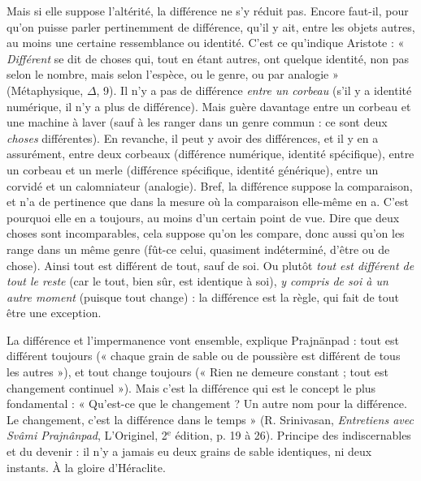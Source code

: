 Mais si elle suppose l’altérité, la différence ne s’y réduit pas. Encore faut-il,
pour qu’on puisse parler pertinemment de différence, qu’il y ait, entre les
objets autres, au moins une certaine ressemblance ou identité. C’est ce
qu’indique Aristote : « {\it Différent} se dit de choses qui, tout en étant autres, ont
quelque identité, non pas selon le nombre, mais selon l’espèce, ou le genre, ou
par analogie » ({\it }Métaphysique, $\Delta$, 9). Il n’y a pas de différence {\it entre un corbeau}
(s’il y a identité numérique, il n’y a plus de différence). Mais guère davantage
entre un corbeau et une machine à laver (sauf à les ranger dans un genre
commun : ce sont deux {\it choses} différentes). En revanche, il peut y avoir des différences,
et il y en a assurément, entre deux corbeaux (différence numérique,
identité spécifique), entre un corbeau et un merle (différence spécifique, identité
générique), entre un corvidé et un calomniateur (analogie). Bref, la différence
suppose la comparaison, et n’a de pertinence que dans la mesure où la
comparaison elle-même en a. C’est pourquoi elle en a toujours, au moins d’un
certain point de vue. Dire que deux choses sont incomparables, cela suppose
qu’on les compare, donc aussi qu’on les range dans un même genre (fût-ce
celui, quasiment indéterminé, d’être ou de chose). Ainsi tout est différent de
tout, sauf de soi. Ou plutôt {\it tout est différent de tout le reste} (car le tout, bien sûr,
est identique à soi), {\it y compris de soi à un autre moment} (puisque tout change) :
la différence est la règle, qui fait de tout être une exception.

La différence et l’impermanence vont ensemble, explique Prajnänpad : tout
est différent toujours (« chaque grain de sable ou de poussière est différent de
tous les autres »), et tout change toujours (« Rien ne demeure constant ; tout
est changement continuel »). Mais c’est la différence qui est le concept le plus
fondamental : « Qu'est-ce que le changement ? Un autre nom pour la différence.
Le changement, c’est la différence dans le temps » (R. Srinivasan, {\it Entretiens
avec Svâmi Prajnânpad}, L'Originel, 2$^\text{e}$ édition, p. 19 à 26). Principe des
indiscernables et du devenir : il n’y a jamais eu deux grains de sable identiques,
ni deux instants. À la gloire d’Héraclite.

